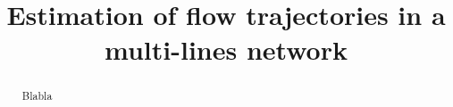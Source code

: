 \documentclass{bmcart}
\begin{document}
\begin{frontmatter}

\begin{fmbox}


\title{Estimation of flow trajectories in a multi-lines network}

\author[
  addressref={aff1},                   
  corref={aff1},                       
  email={gguex@unil.ch}
]{ }
\author[
  addressref={aff2},
  email={rloup@unil.ch}
]{ }
\author[
addressref={aff1, aff2},
email={fbavaud@unil.ch}
]{ }

\address[id=aff1]{%
  ,             
  ,          
  ,                              
}
\address[id=aff2]{%
  ,
  ,          
  ,                       
}

\end{fmbox}


\begin{abstractbox}

\begin{abstract} %
Blabla
\end{abstract}


\begin{keyword}
\end{keyword}


\end{abstractbox}

\end{frontmatter}


\end{document}
